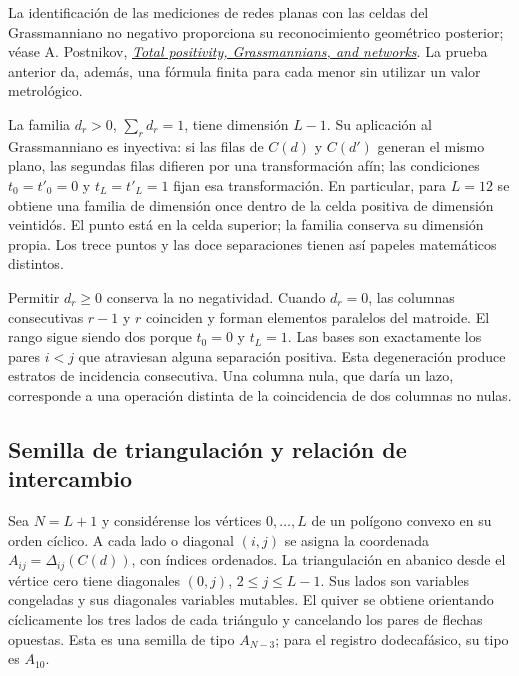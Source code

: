 \documentclass[a4paper,10pt]{article}
\theoremstyle{definition}\newtheorem{definition}[theorem]{Definición}
\theoremstyle{remark}\newtheorem{remark}[theorem]{Observación}
\numberwithin{equation}{section}
\begin{document}
La identificación de las mediciones de redes planas con las celdas del
Grassmanniano no negativo proporciona su reconocimiento geométrico posterior;
véase A. Postnikov,
\href{https://arxiv.org/abs/math/0609764}{\emph{Total positivity,
Grassmannians, and networks}}. La prueba anterior da, además, una fórmula
finita para cada menor sin utilizar un valor metrológico.

La familia \(d_r>0\), \(\sum_rd_r=1\), tiene dimensión \(L-1\).
Su aplicación al Grassmanniano es inyectiva: si las filas de \(C(d)\) y
\(C(d')\) generan el mismo plano, las segundas filas difieren por una
transformación afín; las condiciones \(t_0=t'_0=0\) y
\(t_L=t'_L=1\) fijan esa transformación. En particular, para \(L=12\)
se obtiene una familia de dimensión once dentro de la celda positiva de
dimensión veintidós. El punto está en la celda superior; la familia conserva
su dimensión propia. Los trece puntos y las doce separaciones tienen así
papeles matemáticos distintos.

Permitir \(d_r\ge0\) conserva la no negatividad. Cuando \(d_r=0\), las
columnas consecutivas \(r-1\) y \(r\) coinciden y forman elementos
paralelos del matroide. El rango sigue siendo dos porque \(t_0=0\) y
\(t_L=1\). Las bases son exactamente los pares \(i<j\) que atraviesan
alguna separación positiva. Esta degeneración produce estratos de incidencia
consecutiva. Una columna nula, que daría un lazo, corresponde a una operación
distinta de la coincidencia de dos columnas no nulas.

\subsection{Semilla de triangulación y relación de intercambio}

Sea \(N=L+1\) y considérense los vértices \(0,\ldots,L\) de un polígono
convexo en su orden cíclico. A cada lado o diagonal \((i,j)\) se asigna
la coordenada \(A_{ij}=\Delta_{ij}(C(d))\), con índices ordenados.
La triangulación en abanico desde el vértice cero tiene diagonales
\((0,j)\), \(2\le j\le L-1\). Sus lados son variables congeladas y
sus diagonales variables mutables. El quiver se obtiene orientando
cíclicamente los tres lados de cada triángulo y cancelando los pares de
flechas opuestas. Esta es una semilla de tipo \(A_{N-3}\); para el registro
dodecafásico, su tipo es \(A_{10}\).
\end{document}

